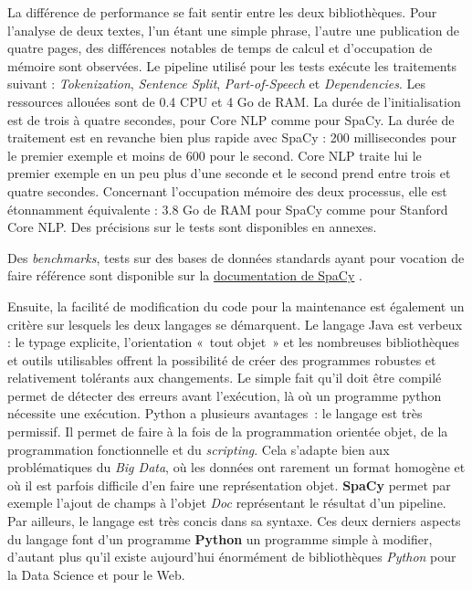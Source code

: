 La différence de performance se fait sentir entre les deux bibliothèques. Pour l'analyse de deux textes, l'un étant une simple phrase, l'autre une publication de quatre pages, des différences notables de temps de calcul et d'occupation de mémoire sont observées. Le pipeline utilisé pour les tests exécute les traitements suivant : \textit{Tokenization}, \textit{Sentence Split}, \textit{Part-of-Speech} et \textit{Dependencies}. Les ressources allouées sont de 0.4 CPU et 4 Go de RAM. La durée de l'initialisation est de trois à quatre secondes, pour Core NLP comme pour SpaCy. La durée de traitement est en revanche bien plus rapide avec SpaCy : 200 millisecondes pour le premier exemple et moins de 600 pour le second. Core NLP traite lui le premier exemple en un peu plus d'une seconde et le second prend entre trois et quatre secondes. Concernant l'occupation mémoire des deux processus, elle est étonnamment équivalente : 3.8 Go de RAM pour SpaCy comme pour Stanford Core NLP.  Des précisions sur le tests sont disponibles en annexes.

Des \textit{benchmarks}, tests sur des bases de données standards ayant pour vocation de faire référence sont disponible sur la  \href{https://spacy.io/usage/facts-figures}{documentation de SpaCy} \cite{spacy-figures}.
\newline

Ensuite, la facilité de modification du code pour la maintenance est également un critère sur lesquels les deux langages se démarquent. Le langage Java est verbeux : le typage explicite, l'orientation «~tout objet~» et les nombreuses bibliothèques et outils utilisables offrent la possibilité de créer des programmes robustes et relativement tolérants aux changements. Le simple fait qu'il doit être compilé permet de détecter des erreurs avant l'exécution, là où un programme python nécessite une exécution. Python a plusieurs avantages~: le langage est très permissif. Il permet de faire à la fois de la programmation orientée objet, de la programmation fonctionnelle et du \textit{scripting}. Cela s'adapte bien aux problématiques du \textit{Big Data}, où les données ont rarement un format homogène et où il est parfois difficile d'en faire une représentation objet. \textbf{SpaCy} permet par exemple l'ajout de champs à l'objet \textit{Doc} représentant le résultat d'un pipeline. Par ailleurs, le langage est très concis dans sa syntaxe. Ces deux derniers aspects du langage font d'un programme \textbf{Python} un programme simple à modifier, d'autant plus qu'il existe aujourd'hui énormément de bibliothèques \textit{Python} pour la Data Science et pour le Web.
\newline

